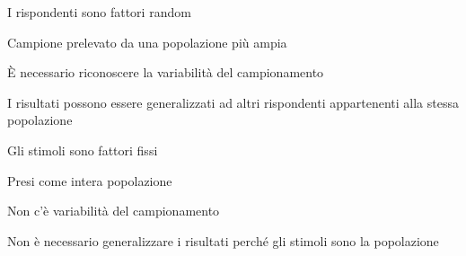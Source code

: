 \documentclass[compress]{beamer}
\begin{document}
\begin{frame}
	
	\begin{block}{I rispondenti sono fattori random}
		
		Campione prelevato da una popolazione più ampia
		
		\vspace{1.5mm}

		È necessario riconoscere la variabilità del campionamento
		
		\vspace{1.5mm}
		I risultati possono essere generalizzati ad altri rispondenti appartenenti alla stessa popolazione
	\end{block}
	
	\vspace{3mm}
	\pause
	\begin{block}{Gli stimoli sono fattori fissi}
		
		Presi come intera popolazione
		
		\vspace{1.5mm}
		Non c'è variabilità del campionamento
		
		\vspace{1.5mm}
		
		Non è necessario generalizzare i risultati perché gli stimoli sono la popolazione
		
	\end{block}
\end{frame}
\end{document}
